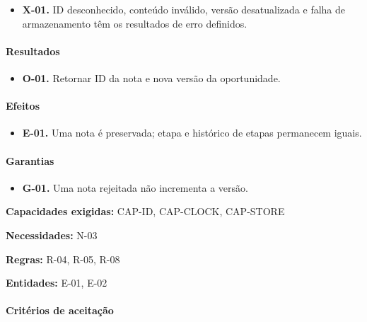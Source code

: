 \documentclass[10pt,a4paper]{article}
\begin{document}
\begin{itemize}

\item \textbf{X-01.} ID desconhecido, conteúdo inválido, versão desatualizada e falha de armazenamento têm os resultados de erro definidos.

\end{itemize}

\paragraph{Resultados}

\begin{itemize}

\item \textbf{O-01.} Retornar ID da nota e nova versão da oportunidade.

\end{itemize}

\paragraph{Efeitos}

\begin{itemize}

\item \textbf{E-01.} Uma nota é preservada; etapa e histórico de etapas permanecem iguais.

\end{itemize}

\paragraph{Garantias}

\begin{itemize}

\item \textbf{G-01.} Uma nota rejeitada não incrementa a versão.

\end{itemize}

\textbf{Capacidades exigidas:} CAP-ID, CAP-CLOCK, CAP-STORE

\textbf{Necessidades:} N-03

\textbf{Regras:} R-04, R-05, R-08

\textbf{Entidades:} E-01, E-02

\paragraph{Critérios de aceitação}
\end{document}
